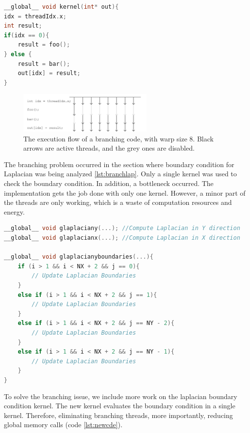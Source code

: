 \begin{lstlisting}[language=C++, label={lst:branch}, caption={Branching threads}]
__global__ void kernel(int* out){
idx = threadIdx.x;
int result;
if(idx == 0){
	result = foo();
} else {
	result = bar();
	out[idx] = result;
}
\end{lstlisting}

\begin{figure}[htbp]
	\centering
		\includegraphics[width=0.6\textwidth]{Figures/threads.png}
		\smallskip
	\caption[he execution flow]{The execution flow of a branching code, with warp size 8. Black arrows are active threads, and the grey ones are disabled.}
	\label{fig:threads}
\end{figure}

The branching problem occurred in the section where boundary condition for Laplacian was being analyzed \ref{lst:branchlap}. Only a single kernel was used to check the boundary condition. In addition, a bottleneck occurred. The implementation gets the job done with only one kernel. However, a minor part of the threads are only working, which is a waste of computation resources and energy.

\begin{lstlisting}[language=C++, label={lst:branchlap}, caption={Branching problem in the Laplacian boundary condition evaluation}]
__global__ void glaplaciany(...); //Compute Laplacian in Y direction
__global__ void glaplacianx(...); //Compute Laplacian in X direction

__global__ void glaplacianyboundaries(...){
    if (i > 1 && i < NX + 2 && j == 0){
     	// Update Laplacian Boundaries
    }
    else if (i > 1 && i < NX + 2 && j == 1){
  		// Update Laplacian Boundaries
  	}
    else if (i > 1 && i < NX + 2 && j == NY - 2){
        // Update Laplacian Boundaries
    }
    else if (i > 1 && i < NX + 2 && j == NY - 1){
        // Update Laplacian Boundaries
    }
}
\end{lstlisting}

To solve the branching issue, we include more work on the laplacian boundary condition kernel. The new kernel evaluates the boundary condition in a single kernel. Therefore, eliminating branching threads, more importantly, reducing global memory calls (code \ref{lst:newcde}).

